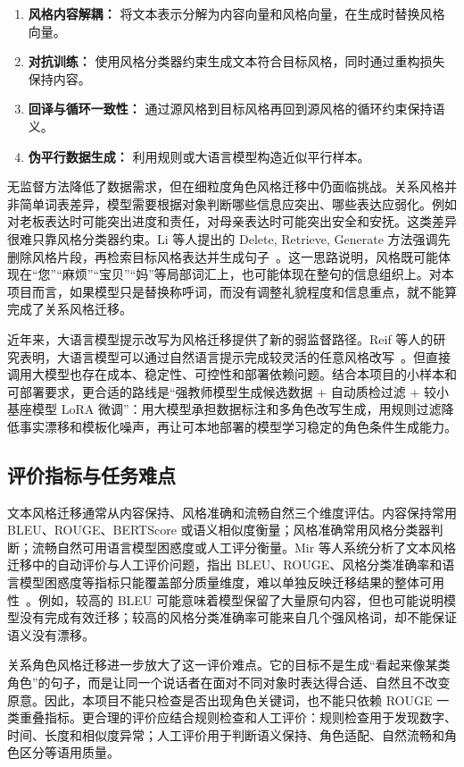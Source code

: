 \documentclass[12pt,a4paper]{ctexart}
\begin{document}
\begin{enumerate}[leftmargin=2em]
  \item \textbf{风格内容解耦：} 将文本表示分解为内容向量和风格向量，在生成时替换风格向量。
  \item \textbf{对抗训练：} 使用风格分类器约束生成文本符合目标风格，同时通过重构损失保持内容。
  \item \textbf{回译与循环一致性：} 通过源风格到目标风格再回到源风格的循环约束保持语义。
  \item \textbf{伪平行数据生成：} 利用规则或大语言模型构造近似平行样本。
\end{enumerate}

无监督方法降低了数据需求，但在细粒度角色风格迁移中仍面临挑战。关系风格并非简单词表差异，模型需要根据对象判断哪些信息应突出、哪些表达应弱化。例如对老板表达时可能突出进度和责任，对母亲表达时可能突出安全和安抚。这类差异很难只靠风格分类器约束。Li 等人提出的 Delete, Retrieve, Generate 方法强调先删除风格片段，再检索目标风格表达并生成句子~\cite{li2018delete}。这一思路说明，风格既可能体现在“您”“麻烦”“宝贝”“妈”等局部词汇上，也可能体现在整句的信息组织上。对本项目而言，如果模型只是替换称呼词，而没有调整礼貌程度和信息重点，就不能算完成了关系风格迁移。

近年来，大语言模型提示改写为风格迁移提供了新的弱监督路径。Reif 等人的研究表明，大语言模型可以通过自然语言提示完成较灵活的任意风格改写~\cite{reif2022}。但直接调用大模型也存在成本、稳定性、可控性和部署依赖问题。结合本项目的小样本和可部署要求，更合适的路线是“强教师模型生成候选数据 + 自动质检过滤 + 较小基座模型 LoRA 微调”：用大模型承担数据标注和多角色改写生成，用规则过滤降低事实漂移和模板化噪声，再让可本地部署的模型学习稳定的角色条件生成能力。

\subsection{评价指标与任务难点}

文本风格迁移通常从内容保持、风格准确和流畅自然三个维度评估。内容保持常用 BLEU、ROUGE、BERTScore 或语义相似度衡量；风格准确常用风格分类器判断；流畅自然可用语言模型困惑度或人工评分衡量。Mir 等人系统分析了文本风格迁移中的自动评价与人工评价问题，指出 BLEU、ROUGE、风格分类准确率和语言模型困惑度等指标只能覆盖部分质量维度，难以单独反映迁移结果的整体可用性~\cite{mir2019evaluating}。例如，较高的 BLEU 可能意味着模型保留了大量原句内容，但也可能说明模型没有完成有效迁移；较高的风格分类准确率可能来自几个强风格词，却不能保证语义没有漂移。

关系角色风格迁移进一步放大了这一评价难点。它的目标不是生成“看起来像某类角色”的句子，而是让同一个说话者在面对不同对象时表达得合适、自然且不改变原意。因此，本项目不能只检查是否出现角色关键词，也不能只依赖 ROUGE 一类重叠指标。更合理的评价应结合规则检查和人工评价：规则检查用于发现数字、时间、长度和相似度异常；人工评价用于判断语义保持、角色适配、自然流畅和角色区分等语用质量。
\end{document}
